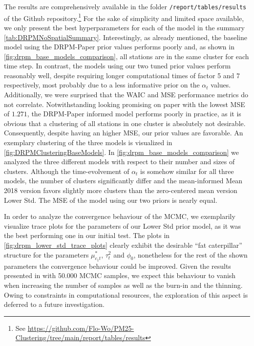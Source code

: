 \documentclass[12pt,a4paper]{article}
\begin{document}
The results are comprehensively available in the folder \texttt{/report/tables/results} of the Github
repository.\footnote{See \url{https://github.com/Flo-Wo/PM25-Clustering/tree/main/report/tables/results}}
For the sake of simplicity and limited space available, we only present the best hyperparameters for each of the model
in the summary \cref{tab:DRPMNoSpatialSummary}. Interestingly, as already mentioned, the baseline model using the 
DRPM-Paper prior values performs poorly and, as shown in \cref{fig:drpm_base_models_comparison}, all stations are in
the same cluster for each time step. In contrast, the models using our two tuned prior values perform reasonably well,
despite requiring longer computational times of factor 5 and 7 respectively, most probably due to a less informative
prior on the $\alpha_t$ values. Additionally, we were surprised that the WAIC and MSE performance metrics do not correlate.
Notwithstanding looking promising on paper with the lowest MSE of $1.271$, the DRPM-Paper informed model performs poorly in practice,
as it is obvious that a clustering of all stations in one cluster is absolutely not desirable. Consequently, despite having
an higher MSE, our prior values are favorable. An exemplary clustering of the three models is visualized in 
\cref{fig:DRPMClusteringBaseModels}. In \cref{fig:drpm_base_models_comparison} we analyzed the three different models
with respect to their number and sizes of clusters. Although the time-evolvement of $\alpha_t$ is somehow similar for all
three models, the number of clusters significantly differ and the mean-informed Mean 2018 version favors slightly more
clusters than the zero-centered mean version Lower Std. The MSE of the model using our two priors is nearly equal.

In order to analyze the convergence behaviour of the MCMC, we exemplarily visualize trace plots for the parameters of
our Lower Std prior model, as it was the best performing one in our initial test. The plots in
\cref{fig:drpm_lower_std_trace_plots} clearly exhibit the desirable \enquote{fat caterpillar} structure for the
parameters $\mu^*_{c_1t}$, $\tau_t^2$ and $\phi_0$, nonetheless for the rest of the shown parameters the convergence
behaviour could be improved. Given the results presented in \cite[Section 4.1]{Page2021-Temporal} with 50.000 MCMC samples,
we expect this behaviour to vanish when increasing the number of samples as well as the burn-in and the thinning.
Owing to constraints in computational resources, the exploration of this aspect is deferred to a future investigation.
\end{document}
